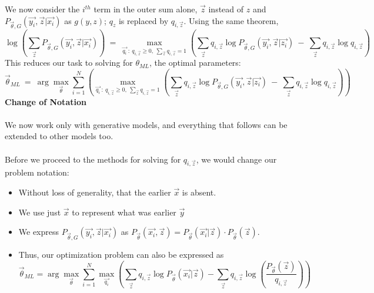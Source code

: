 \documentclass[a4paper]{article}
\begin{document}
We now consider the $i^{th}$ term in the outer sum alone, $\vec{z}$ instead of $z$ and $P_{\vec{\theta}, G} (\vec{y_i}, \vec{z} | \vec{x_i})$ as $g(y, z)$; $q_z$ is replaced by $q_{i, \vec{z}} $. Using the same theorem, \[
\log \left( \sum_{\vec{z}} P_{\vec{\theta}, G} ( \vec{y_i}, \vec{z} | \vec{x_i} ) \right)\ =\ 
\max_{\vec{q_i}\ :\ q_{i, \vec{z}} \geq 0,\ \sum_{\vec{z}} q_{i, \vec{z}} = 1 } \left( 
\sum_{\vec{z}} q_{i, \vec{z}} \log P_{\vec{\theta}, G} (\vec{y_i}, \vec{z} | \vec{z_i})\ -\ 
\sum_{\vec{z}} q_{i, \vec{z}} \log q_{i, \vec{z}} \right)
\] 
This reduces our task to solving for $\theta_{ML}$, the optimal parameters: \[
\vec{\theta}_{ML}\ =\  \arg\max_{\vec{\theta}} \sum_{i = 1}^{N} \left( \max_{\vec{q_i}\ :\ q_{i, \vec{z}} \geq 0,\ \sum_{\vec{z}} q_{i, \vec{z}} = 1 } \left( 
\sum_{\vec{z}} q_{i, \vec{z}} \log P_{\vec{\theta}, G} (\vec{y_i}, \vec{z} | \vec{z_i})\ -\ 
\sum_{\vec{z}} q_{i, \vec{z}} \log q_{i, \vec{z}} \right) \right)
\]
\textbf{Change of Notation} \\ \\
We now work only with generative models, and everything that follows can be extended to other models too. \\ \\
Before we proceed to the methods for solving for $q_{i, \vec{z}}$, we would change our problem notation: 
\begin{itemize}
    \item Without loss of generality, that the earlier $\vec{x}$ is absent.
    \item We use just $\vec{x}$ to represent what was earlier $\vec{y}$ 
    \item We express $P_{\vec{\theta}, G}(\vec{y_i}, \vec{z} | \vec{x_i}) $ as $P_{\vec{\theta}}(\vec{x_i}, \vec{z}) = P_{\vec{\theta}} (\vec{x_i} | \vec{z}) \cdot P_{\vec{\theta}} (\vec{z}) $.
    \item Thus, our optimization problem can also be expressed as \[
    \vec{\theta}_{ML} = \arg\max_{\vec{\theta}} \sum_{i = 1}^{N} \max_{\vec{q_i}} \left( 
    \sum_{\vec{z}} q_{i, \vec{z}} \log P_{\vec{\theta}}(\vec{x_i} | \vec{z}) -
    \sum_{\vec{z}} q_{i, \vec{z}} \log \left(\frac{P_{\vec{\theta}} (\vec{z})}{q_{i, \vec{z}}}\right) \right)
    \]
\end{itemize}
\end{document}
